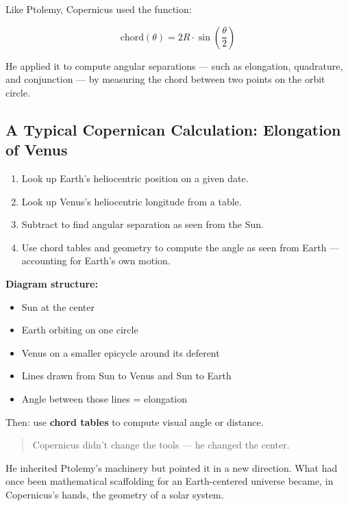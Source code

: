 Like Ptolemy, Copernicus used the function:

\[
\text{chord}(\theta) = 2R \cdot \sin\left(\frac{\theta}{2}\right)
\]

He applied it to compute angular separations — such as elongation, quadrature, and conjunction — by measuring the chord between two points on the orbit circle.

\subsection{A Typical Copernican Calculation: Elongation of Venus}

\begin{enumerate}
  \item Look up Earth’s heliocentric position on a given date.
  \item Look up Venus’s heliocentric longitude from a table.
  \item Subtract to find angular separation as seen from the Sun.
  \item Use chord tables and geometry to compute the angle as seen from Earth — accounting for Earth's own motion.
\end{enumerate}

\begin{center}
\begin{tcolorbox}[colback=gray!5!white, colframe=black, boxrule=0.3pt, arc=1mm, width=0.9\linewidth]
\textbf{Diagram structure:}  
\begin{itemize}
  \item Sun at the center  
  \item Earth orbiting on one circle  
  \item Venus on a smaller epicycle around its deferent  
  \item Lines drawn from Sun to Venus and Sun to Earth  
  \item Angle between those lines = elongation  
\end{itemize}
Then: use \textbf{chord tables} to compute visual angle or distance.
\end{tcolorbox}
\end{center}


\begin{quote}
Copernicus didn’t change the tools — he changed the center.
\end{quote}

He inherited Ptolemy’s machinery but pointed it in a new direction. What had once been mathematical scaffolding for an Earth-centered universe became, in Copernicus’s hands, the geometry of a solar system.

